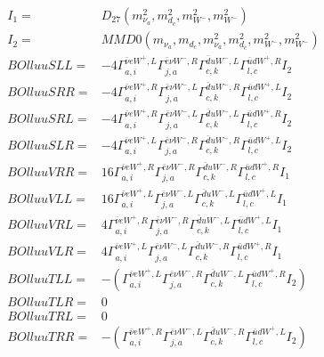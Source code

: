 \documentclass[A4,landscape]{article}
\begin{document}
\begin{align} 
I_1 = & D_{27}(m^2_{\nu_{{a}}}, m^2_{d_{{c}}}, m^2_{W^-}, m^2_{W^-}) \\ 
I_2 = & MMD0(m_{\nu_{{a}}}, m_{d_{{c}}}, m^2_{\nu_{{a}}}, m^2_{d_{{c}}}, m^2_{W^-}, m^2_{W^-}) \\ 
  BOlluuSLL= & -4  \Gamma^{\bar{\nu}e W^+,L}_{a, i} \Gamma^{\bar{e}\nu W^- ,R}_{j, a} \Gamma^{\bar{d}u W^- ,L}_{c, k} \Gamma^{\bar{u}d W^+,R}_{l, c} I_2 \\ 
  BOlluuSRR= & -4  \Gamma^{\bar{\nu}e W^+,R}_{a, i} \Gamma^{\bar{e}\nu W^- ,L}_{j, a} \Gamma^{\bar{d}u W^- ,R}_{c, k} \Gamma^{\bar{u}d W^+,L}_{l, c} I_2 \\ 
  BOlluuSRL= & -4  \Gamma^{\bar{\nu}e W^+,R}_{a, i} \Gamma^{\bar{e}\nu W^- ,L}_{j, a} \Gamma^{\bar{d}u W^- ,L}_{c, k} \Gamma^{\bar{u}d W^+,R}_{l, c} I_2 \\ 
  BOlluuSLR= & -4  \Gamma^{\bar{\nu}e W^+,L}_{a, i} \Gamma^{\bar{e}\nu W^- ,R}_{j, a} \Gamma^{\bar{d}u W^- ,R}_{c, k} \Gamma^{\bar{u}d W^+,L}_{l, c} I_2 \\ 
  BOlluuVRR= & 16  \Gamma^{\bar{\nu}e W^+,R}_{a, i} \Gamma^{\bar{e}\nu W^- ,R}_{j, a} \Gamma^{\bar{d}u W^- ,R}_{c, k} \Gamma^{\bar{u}d W^+,R}_{l, c} I_1 \\ 
  BOlluuVLL= & 16  \Gamma^{\bar{\nu}e W^+,L}_{a, i} \Gamma^{\bar{e}\nu W^- ,L}_{j, a} \Gamma^{\bar{d}u W^- ,L}_{c, k} \Gamma^{\bar{u}d W^+,L}_{l, c} I_1 \\ 
  BOlluuVRL= & 4  \Gamma^{\bar{\nu}e W^+,R}_{a, i} \Gamma^{\bar{e}\nu W^- ,R}_{j, a} \Gamma^{\bar{d}u W^- ,L}_{c, k} \Gamma^{\bar{u}d W^+,L}_{l, c} I_1 \\ 
  BOlluuVLR= & 4  \Gamma^{\bar{\nu}e W^+,L}_{a, i} \Gamma^{\bar{e}\nu W^- ,L}_{j, a} \Gamma^{\bar{d}u W^- ,R}_{c, k} \Gamma^{\bar{u}d W^+,R}_{l, c} I_1 \\ 
  BOlluuTLL= & -( \Gamma^{\bar{\nu}e W^+,L}_{a, i} \Gamma^{\bar{e}\nu W^- ,R}_{j, a} \Gamma^{\bar{d}u W^- ,L}_{c, k} \Gamma^{\bar{u}d W^+,R}_{l, c} I_2) \\ 
  BOlluuTLR= & 0 \\ 
  BOlluuTRL= & 0 \\ 
  BOlluuTRR= & -( \Gamma^{\bar{\nu}e W^+,R}_{a, i} \Gamma^{\bar{e}\nu W^- ,L}_{j, a} \Gamma^{\bar{d}u W^- ,R}_{c, k} \Gamma^{\bar{u}d W^+,L}_{l, c} I_2) \\ 
\end{align} 
\end{document}

